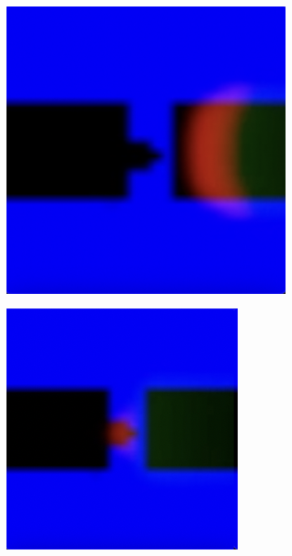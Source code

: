 \begin{figure}
	\centering
	\begin{subfigure}{0.24\textwidth}
		\includegraphics[width=\linewidth]{diode/easy/Screenshot 2024-03-09 at 16.21.56.png} 
	\end{subfigure}
	\begin{subfigure}{0.24\textwidth}
		\includegraphics[width=\linewidth]{diode/easy/Screenshot 2024-03-09 at 16.22.24.png} 

\end{subfigure}
\end{figure}
